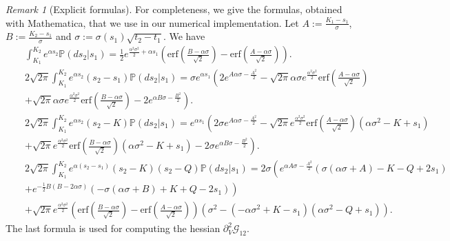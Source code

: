 \documentclass{amsart}%
\def\no{\noindent}
\theoremstyle{definition}
\theoremstyle{remark}
\newtheorem{rem}[thm]{Remark}
\newcommand{\PP}{\mathbb{P}}
\newcommand{\beaa}{\begin{eqnarray*}}
\newcommand{\eeaa}{\end{eqnarray*}}
\newcommand{\cal}{\mathcal}
\begin{document}
\begin{rem}[Explicit formulas]\label{rmk:closed_formulas}
For completeness, we give the formulas, obtained  with Mathematica, that we use in our numerical implementation. Let $A:=\frac{K_1-s_1 }{\sigma}$, $B:=\frac{K_2-s_1 }{\sigma}$ and $\sigma:=\sigma(s_1)\sqrt{t_2-t_1}$. We have
\beaa
&&\int_{K_1}^{K_2} e^{ \alpha s_2}  \PP(ds_2|s_1)=
\frac{1}{2} e^{\frac{\alpha ^2 \sigma ^2}{2}+\alpha
   s_1} \left(\text{erf}\left(\frac{B-\alpha  \sigma
   }{\sqrt{2}}\right)-\text{erf}\left(\frac{A-\alpha  \sigma
   }{\sqrt{2}}\right)\right). \\
 &&2 \sqrt{2 \pi}\int_{K_1}^{K_2} e^{ \alpha s_2} (s_2-s_1) \PP(ds_2|s_1)= \sigma  e^{\alpha  s_1} \left(2 e^{A \alpha
   \sigma -\frac{A^2}{2}}-\sqrt{2 \pi } \alpha \sigma
   e^{\frac{\alpha ^2 \sigma ^2}{2}}
   \text{erf}\left(\frac{A-\alpha  \sigma
   }{\sqrt{2}}\right)\right. \\
   &&\left.+\sqrt{2 \pi } \alpha  \sigma
   e^{\frac{\alpha ^2 \sigma ^2}{2}}
   \text{erf}\left(\frac{B-\alpha  \sigma }{\sqrt{2}}\right) -2e^{\alpha  B \sigma -\frac{B^2}{2}}\right).\\
 && 2 \sqrt{2 \pi }\int_{K_1}^{K_2} e^{ \alpha s_2} (s_2-K) \PP(ds_2|s_1)= e^{\alpha  s_1} \left(2 \sigma  e^{A \alpha
   \sigma -\frac{A^2}{2}}-\sqrt{2 \pi } e^{\frac{\alpha ^2
   \sigma ^2}{2}} \text{erf}\left(\frac{A-\alpha  \sigma
   }{\sqrt{2}}\right) \left(\alpha  \sigma
   ^2-K+s_1\right) \right. \\
   && \left. +\sqrt{2 \pi } e^{\frac{\alpha ^2
   \sigma ^2}{2}} \text{erf}\left(\frac{B-\alpha  \sigma
   }{\sqrt{2}}\right) \left(\alpha  \sigma
   ^2-K+s_1\right)  -2 \sigma  e^{\alpha  B \sigma
   -\frac{B^2}{2}}\right). \\
 &&2 \sqrt{2 \pi }\int_{K_1}^{K_2} e^{ \alpha (s_2-s_1)} (s_2-K)(s_2-Q) \PP(ds_2|s_1)=2 \sigma  \left(e^{\alpha  A
   \sigma -\frac{A^2}{2}} (\sigma  (\alpha  \sigma +A)-K-Q+2
   s_1) \right.\\ &&\left.+e^{-\frac{1}{2} B (B-2 \alpha  \sigma )} (-\sigma
   (\alpha  \sigma +B)+K+Q-2 s_1)\right)\\
   &&+\sqrt{2 \pi }
   e^{\frac{\alpha ^2 \sigma ^2}{2}}
   \left(\text{erf}\left(\frac{B-\alpha  \sigma
   }{\sqrt{2}}\right)-\text{erf}\left(\frac{A-\alpha  \sigma
   }{\sqrt{2}}\right)\right) \left(\sigma ^2-\left(-\alpha  \sigma
   ^2+K-s_1\right) \left(\alpha  \sigma
   ^2-Q+s_1\right)\right).
   \eeaa
   \no The last formula is used for computing the hessian $\partial_V^2  {\cal G}_{12}$.
\end{rem}
\end{document}
